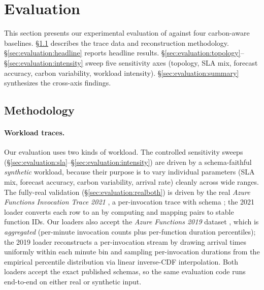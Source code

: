 \section{Evaluation}
\label{sec:evaluation}

This section presents our experimental evaluation of \GreenFaaS{}
against four carbon-aware baselines. \S\ref{sec:evaluation:methodology}
describes the trace data and reconstruction methodology.
\S\ref{sec:evaluation:headline} reports headline results.
\S\ref{sec:evaluation:topology}--\S\ref{sec:evaluation:intensity}
sweep five sensitivity axes (topology, SLA mix, forecast accuracy,
carbon variability, workload intensity).
\S\ref{sec:evaluation:summary} synthesizes the cross-axis findings.

\subsection{Methodology}
\label{sec:evaluation:methodology}

\paragraph{Workload traces.} Our evaluation uses two kinds of
workload. The controlled sensitivity sweeps
(\S\ref{sec:evaluation:sla}--\S\ref{sec:evaluation:intensity}) are
driven by a schema-faithful \emph{synthetic} workload, because their
purpose is to vary individual parameters (SLA mix, forecast accuracy,
carbon variability, arrival rate) cleanly across wide ranges. The
fully-real validation (\S\ref{sec:evaluation:realboth}) is driven by
the real \emph{Azure Functions Invocation Trace 2021}
\citep{zhang2021faster,azuretrace}, a per-invocation trace with schema
; the 2021 loader converts
each row to an  by computing
 and mapping
 pairs to stable function IDs. Our loaders also
accept the \emph{Azure Functions 2019} dataset
\citep{shahrad2020serverless}, which is \emph{aggregated} (per-minute
invocation counts plus per-function duration percentiles); the 2019
loader reconstructs a per-invocation stream by drawing arrival times
uniformly within each minute bin and sampling per-invocation durations
from the empirical percentile distribution via linear inverse-CDF
interpolation. Both loaders accept the exact published schemas, so the
same evaluation code runs end-to-end on either real or synthetic
input.

